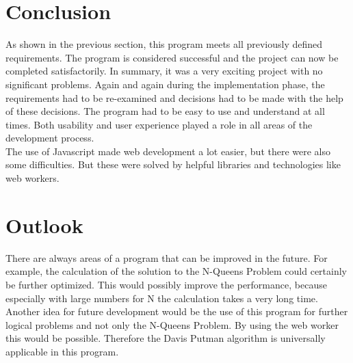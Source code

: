 \section{Conclusion}
As shown in the previous section, this program meets all previously defined requirements. The program is considered successful and the project can now be completed satisfactorily. In summary, it was a very exciting project with no significant problems. Again and again during the implementation phase, the requirements had to be re-examined and decisions had to be made with the help of these decisions. The program had to be easy to use and understand at all times. Both usability and user experience played a role in all areas of the development process. 
\\
The use of Javascript made web development a lot easier, but there were also some difficulties. But these were solved by helpful libraries and technologies like web workers. 
\section{Outlook} 
There are always areas of a program that can be improved in the future. For example, the calculation of the solution to the N-Queens Problem could certainly be further optimized. This would possibly improve the performance, because especially with large numbers for N the calculation takes a very long time. 
\\
Another idea for future development would be the use of this program for further logical problems and not only the N-Queens Problem. By using the web worker this would be possible. Therefore the Davis Putman algorithm is universally applicable in this program.
